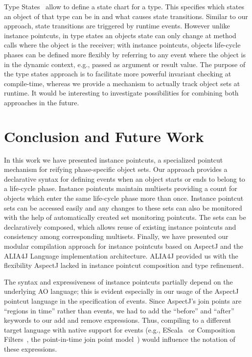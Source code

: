 Type States~\cite{DeLine2004} allow to define a state chart for a type.
This specifies which states an object of that type can be in and what causes state transitions.
Similar to our approach, state transitions are triggered by runtime events.
However unlike instance pointcuts, in type states an objects state can only change at method calls where the object is the receiver; with instance pointcuts, objects life-cycle phases can be defined more flexibly by referring to any event where the object is in the dynamic context, e.g., passed as argument or result value.
The purpose of the type states approach is to facilitate more powerful invariant checking at compile-time, whereas we provide a mechanism to actually track object sets at runtime.
It would be interesting to investigate possibilities for combining both approaches in the future.

\section{Conclusion and Future Work}
In this work we have presented instance pointcuts, a specialized pointcut mechanism for reifying phase-specific object sets.
Our approach provides a declarative syntax for defining events when an object starts or ends to belong to a life-cycle phase.
Instance pointcuts maintain multisets providing a count for objects which enter the same life-cycle phase more than once.
Instance pointcut sets can be accessed easily and any changes to these sets can also be monitored with the help of automatically created set monitoring pointcuts.
The sets can be declaratively composed, which allows reuse of existing instance pointcuts and consistency among corresponding multisets.
Finally, we have presented our modular compilation approach for instance pointcuts based on AspectJ and the ALIA4J Language implementation architecture.
ALIA4J provided us with the flexibility AspectJ lacked in instance pointcut composition and type refinement.

The syntax and expressiveness of instance pointcuts partially depend on the underlying AO language;
this is evident especially in our usage of the AspectJ pointcut language in the specification of events.
Since AspectJ's join points are ``regions in time'' rather than events, we had to add the ``before'' and ``after'' keywords to our add and remove expressions.
Thus, compiling to a different target language with native support for events (e.g., EScala~\cite{Gasiunas2011} or Composition Filters~\cite{Bergmans2001b}, the point-in-time join point model~\cite{masuharafine}) would influence the notation of these expressions.

